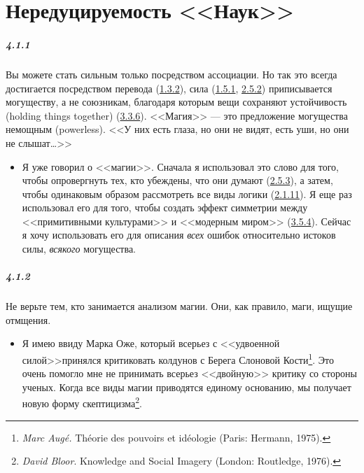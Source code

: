 \chapter{Нередуцируемость <<Наук>>}


\paragraph{4.1.1}\hypertarget{par:4.1.1}{} Вы можете стать сильным только посредством ассоциации. Но так это всегда достигается посредством перевода (\hyperlink{par:1.3.2}{1.3.2}), сила (\hyperlink{par:1.5.1}{1.5.1}, \hyperlink{par:2.5.2}{2.5.2}) приписывается могуществу, а не союзникам, благодаря которым вещи сохраняют устойчивость (holding things together) (\hyperlink{par:3.3.6}{3.3.6}). <<Магия>> --- это предложение могущества немощным (powerless). <<У них есть глаза, но они не видят, есть уши, но они не слышат{\ldots}>>
	\begin{itemize}
	\item 
	Я уже говорил о <<магии>>. Сначала я использовал это слово для того, чтобы опровергнуть тех, кто убеждены, что они думают (\hyperlink{par:2.5.3}{2.5.3}), а затем, чтобы одинаковым образом рассмотреть все виды логики (\hyperlink{par:2.1.11}{2.1.11}). Я еще раз использовал его для того, чтобы создать эффект симметрии между <<примитивными культурами>> и <<модерным миром>> (\hyperlink{par:3.5.4}{3.5.4}). Сейчас я хочу использовать его для описания {\itshape всех} ошибок относительно истоков силы, {\itshape всякого} могущества.
	\end{itemize}	


\paragraph{4.1.2}\hypertarget{par:4.1.2}{} Не верьте тем, кто занимается анализом магии. Они, как правило, маги, ищущие отмщения.
	\begin{itemize}
	\item 
	Я имею ввиду Марка Оже, который всерьез с <<удвоенной силой>>принялся критиковать колдунов с Берега Слоновой Кости\footnote{{\itshape Marc Aug\'{e}.} Th\'{e}orie des pouvoirs et id\'{e}ologie (Paris: Hermann, 1975).}. Это очень помогло мне не принимать всерьез <<двойную>> критику со стороны ученых. Когда все виды магии приводятся единому основанию, мы получает новую форму скептицизма\footnote{{\itshape David Bloor}. Knowledge and Social Imagery (London: Routledge, 1976).}.
	\end{itemize}	

